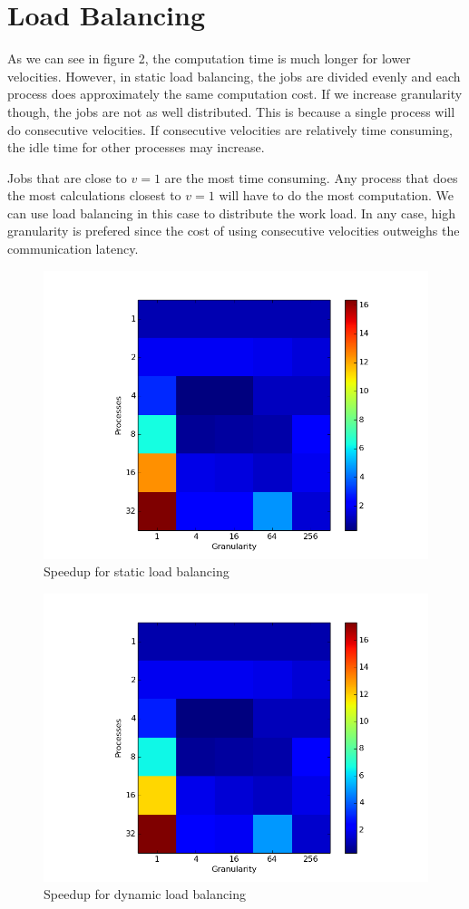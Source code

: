 \documentclass{article}
\begin{document}
\section{Load Balancing}

As we can see in figure 2, the computation time is much longer for lower velocities. However, in static load balancing, the jobs are divided evenly and each process does approximately the same computation cost.
If we increase granularity though, the jobs are not as well distributed.
This is because a single process will do consecutive velocities.
If consecutive velocities are relatively time consuming, the idle time for other processes may increase.

Jobs that are close to $v=1$ are the most time consuming. Any process that does the most calculations closest to $v=1$ will have to do the most computation. We can use load balancing in this case to distribute the work load. In any case, high granularity is prefered since the cost of using consecutive velocities outweighs the communication latency.

\begin{figure}[H]
\includegraphics[width=\textwidth]{speedup_static.png}
\caption{Speedup for static load balancing}
\end{figure}

\begin{figure}[H]
\includegraphics[width=\textwidth]{speedup_dynamic.png}
\caption{Speedup for dynamic load balancing}
\end{figure}
\end{document}
